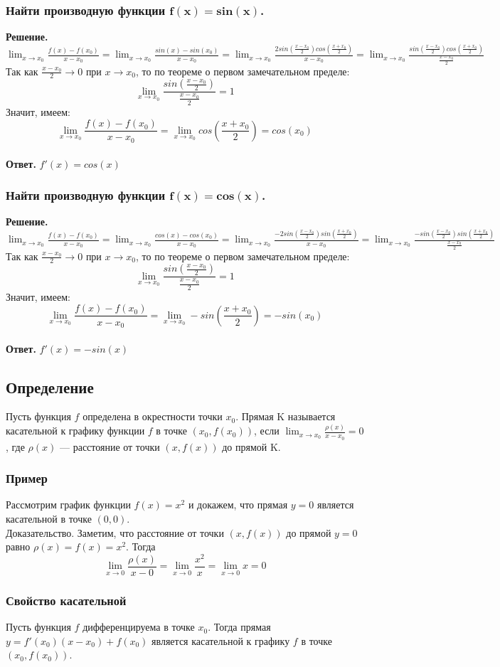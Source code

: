 \documentclass[11pt,a4paper]{article}
\begin{document}
\subsubsection{Найти производную функции $\mathbf{f(x) = sin(x)}$.}
{\bf Решение.} $\lim_{x \to x_0} \frac{f(x) - f(x_0)}{x - x_0} = \lim_{x \to x_0} \frac{sin(x) - sin(x_0)}{x - x_0} = \lim_{x \to x_0} \frac{2sin(\frac{x - x_0}{2})cos(\frac{x + x_0}{2})}{x - x_0} = \lim_{x \to x_0} \frac{sin(\frac{x - x_0}{2})cos(\frac{x + x_0}{2})}{\frac{x - x_0}{2}}$
Так как $\frac{x - x_0}{2} \to 0$ при $x \to x_0$, то по теореме о первом замечательном пределе: $$\lim_{x \to x_0} \frac{sin(\frac{x - x_0}{2})}{\frac{x - x_0}{2}} = 1$$
Значит, имеем:
$$\lim_{x \to x_0} \frac{f(x) - f(x_0)}{x - x_0} = \lim_{x \to x_0} cos(\frac{x + x_0}{2}) = cos(x_0)$$\\
{\bf Ответ.} $f'(x) = cos(x)$

\subsubsection{Найти производную функции $\mathbf{f(x) = cos(x)}$.}
{\bf Решение.}
$\lim_{x \to x_0} \frac{f(x) - f(x_0)}{x - x_0} = \lim_{x \to x_0} \frac{cos(x) - cos(x_0)}{x - x_0} = \lim_{x \to x_0} \frac{-2sin(\frac{x - x_0}{2})sin(\frac{x + x_0}{2})}{x - x_0} = \lim_{x \to x_0} \frac{-sin(\frac{x - x_0}{2})sin(\frac{x + x_0}{2})}{\frac{x - x_0}{2}}$
Так как $\frac{x - x_0}{2} \to 0$ при $x \to x_0$, то по теореме о первом замечательном пределе: $$\lim_{x \to x_0} \frac{sin(\frac{x - x_0}{2})}{\frac{x - x_0}{2}} = 1$$
Значит, имеем:
$$\lim_{x \to x_0} \frac{f(x) - f(x_0)}{x - x_0} = \lim_{x \to x_0} -sin(\frac{x + x_0}{2}) = -sin(x_0)$$\\
{\bf Ответ.} $f'(x) = -sin(x)$


\subsection{Определение}
Пусть функция $f$ определена в окрестности точки $x_0$. Прямая K называется касательной к графику функции $f$ в точке $(x_0, f(x_0))$, если $\lim_{x \to x_0} \frac{\rho(x)}{x - x_0} = 0 $, где $\rho(x)$ — расстояние от точки $(x, f (x))$ до прямой K.
\subsubsection{Пример}
Рассмотрим график функции $f(x) = x^2 $ и докажем, что прямая $y = 0$ является касательной в точке $(0,0)$.\\
Доказательство. Заметим, что расстояние от точки $(x, f (x))$ до прямой $y = 0$ равно $\rho(x) = f(x) = x^2$. Тогда 
$$\lim_{x \to 0} \frac{\rho(x)}{x - 0} =  \lim_{x \to 0} \frac{x^2}{x} = \lim_{x \to 0} x = 0 $$
\subsubsection{Свойство касательной}
Пусть функция $f$ дифференцируема в точке $x_0$. Тогда прямая $y = f'(x_0) (x - x_0) + f(x_0)$ является касательной к графику $f$ в точке $(x_0, f(x_0))$.
\end{document}
